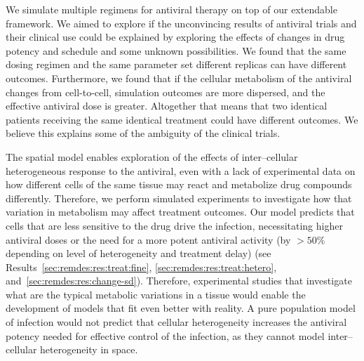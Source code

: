 We simulate multiple regimens for antiviral therapy on top of our extendable framework. We aimed to explore if the unconvincing results of antiviral trials and their clinical use could be explained by exploring the effects of changes in drug potency and schedule and some unknown possibilities. We found that the same dosing regimen and the same parameter set different replicas can have different outcomes. Furthermore, we found that if the cellular metabolism of the antiviral changes from cell-to-cell, simulation outcomes are more dispersed, and the effective antiviral dose is greater. Altogether that means that two identical patients receiving the same identical treatment could have different outcomes. We believe this explains some of the ambiguity of the clinical trials.

The spatial model enables exploration of the effects of inter--cellular heterogeneous response to the antiviral, even with a lack of experimental data on how different cells of the same tissue may react and metabolize drug compounds differently. Therefore, we perform simulated experiments to investigate how that variation in metabolism may affect treatment outcomes. Our model predicts that cells that are less sensitive to the drug drive the infection, necessitating higher antiviral doses or the need for a more potent antiviral activity (by $>50\%$ depending on level of heterogeneity and treatment delay) (see Results~\ref{sec:remdes:res:treat:fine}, \ref{sec:remdes:res:treat:hetero}, and~\ref{sec:remdes:res:change-sd}). Therefore, experimental studies that investigate what are the typical metabolic variations in a tissue would enable the development of models that fit even better with reality. A pure population model of infection would not predict that cellular heterogeneity increases the antiviral potency needed for effective control of the infection, as they cannot model inter--cellular heterogeneity in space.%


